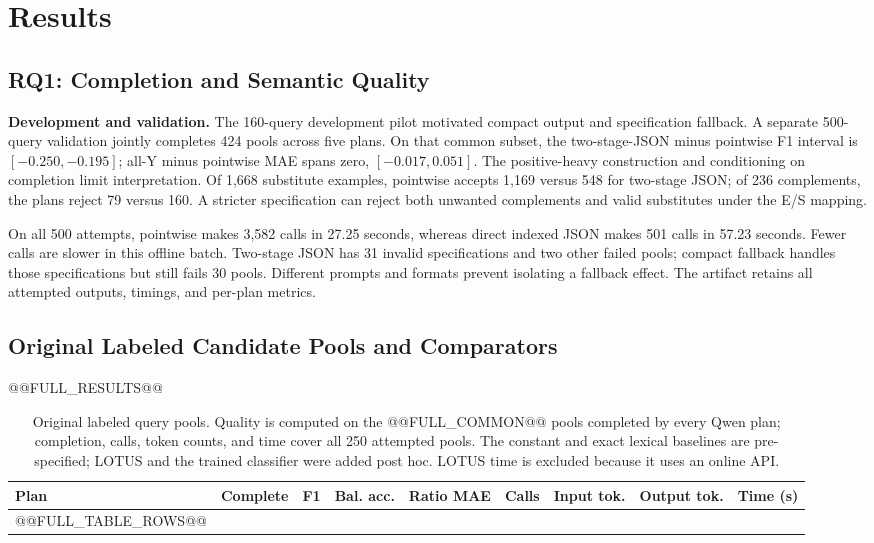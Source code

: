 \documentclass[conference]{IEEEtran}
\begin{document}
\section{Results}
\subsection{RQ1: Completion and Semantic Quality}
\textbf{Development and validation.} The 160-query development pilot motivated compact output and specification fallback. A separate 500-query validation jointly completes 424 pools across five plans. On that common subset, the two-stage-JSON minus pointwise F1 interval is $[-0.250,-0.195]$; all-Y minus pointwise MAE spans zero, $[-0.017,0.051]$. The positive-heavy construction and conditioning on completion limit interpretation. Of 1,668 substitute examples, pointwise accepts 1,169 versus 548 for two-stage JSON; of 236 complements, the plans reject 79 versus 160. A stricter specification can reject both unwanted complements and valid substitutes under the E/S mapping.

On all 500 attempts, pointwise makes 3,582 calls in 27.25 seconds, whereas direct indexed JSON makes 501 calls in 57.23 seconds. Fewer calls are slower in this offline batch. Two-stage JSON has 31 invalid specifications and two other failed pools; compact fallback handles those specifications but still fails 30 pools. Different prompts and formats prevent isolating a fallback effect. The artifact retains all attempted outputs, timings, and per-plan metrics.

\subsection{Original Labeled Candidate Pools and Comparators}
@@FULL_RESULTS@@

\begin{table}[t]
\caption{Original labeled query pools. Quality is computed on the @@FULL_COMMON@@ pools completed by every Qwen plan; completion, calls, token counts, and time cover all 250 attempted pools. The constant and exact lexical baselines are pre-specified; LOTUS and the trained classifier were added post hoc. LOTUS time is excluded because it uses an online API.}
\label{tab:full}
\centering\small
\begin{tabular}{lrrrrrrrr}
\toprule
Plan & Complete & F1 & Bal. acc. & Ratio MAE & Calls & Input tok. & Output tok. & Time (s) \\
\midrule
@@FULL_TABLE_ROWS@@
\bottomrule
\end{tabular}
\end{table}
\end{document}
